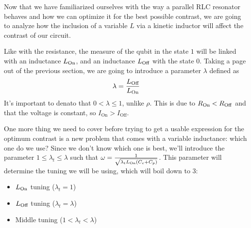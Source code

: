 \documentclass[../main.tex]{subfiles}
\begin{document}
Now that we have familiarized ourselves with the way a parallel RLC resonator
behaves and how we can optimize it for the best possible contrast, we are going
to analyze how the inclusion of a variable \(L\) via a kinetic inductor
will affect the contrast of our circuit.


Like with the resistance, the measure of the qubit in the state \(1\) will be
linked with an inductance \(L_{\text{On}}\), and an inductance
\(L_{\text{Off}}\) with the state \(0\). Taking a page out of the previous
section, we are going to introduce a parameter \(\lambda\) defined as
\begin{equation}
\label{eq:LambdaDef}
    \lambda = \frac{L_{\text{Off}}}{L_{\text{On}}}
\end{equation}
It's important to denato that \(0 < \lambda \leq 1\), unlike \(\rho\). This is due to
\(R_{\text{On}} < R_{\text{Off}}\) and that the voltage is constant, so
\(I_{\text{On}} > I_{\text{Off}}\).

One more thing we need to cover before trying to get a usable expression for
the optimum contrast is a new problem that comes with a variable inductance:
which one do we use? Since we don't know which one is best, we'll introduce
the parameter \(1 \leq \lambda_{t} \leq \lambda\) such that
\(\omega = \frac{1}{\sqrt{\lambda_{t}L_{\text{On}}(C_{c} + C_{p})}}\).
This parameter will determine the tuning we will be using, which will boil
down to 3:

\begin{itemize}[]
    \item \(L_{\text{On}}\) tuning (\(\lambda_{t} = 1\))
    \item \(L_{\text{Off}}\) tuning (\(\lambda_{t} = \lambda\))
    \item Middle tuning (\(1 < \lambda_{t} < \lambda\))
\end{itemize}
\end{document}
